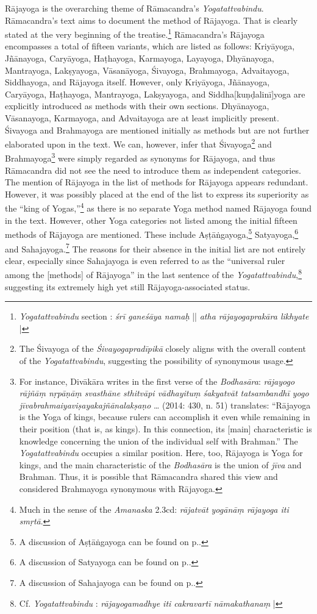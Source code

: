 Rājayoga is the overarching theme of Rāmacandra's \emph{Yogatattvabindu}. Rāmacandra's text aims to document the method of Rājayoga. That is clearly stated at the very beginning of the treatise.\footnote{\emph{Yogatattvabindu} section : \textit{śrī ganeśāya namaḥ} || \textit{atha rājayogaprakāra likhyate} |} Rāmacandra's Rājayoga encompasses a total of fifteen variants, which are listed as follows: Kriyāyoga, Jñānayoga, Caryāyoga, Haṭhayoga, Karmayoga, Layayoga, Dhyānayoga, Mantrayoga, Lakṣyayoga, Vāsanāyoga, Śivayoga, Brahmayoga, Advaitayoga, Siddhayoga, and Rājayoga itself. However, only Kriyāyoga, Jñānayoga, Caryāyoga, Haṭhayoga, Mantrayoga, Lakṣyayoga, and Siddha[kuṇḍalinī]yoga are explicitly introduced as methods with their own sections. Dhyānayoga, Vāsanayoga, Karmayoga, and Advaitayoga are at least implicitly present. Śivayoga and Brahmayoga are mentioned initially as methods but are not further elaborated upon in the text. We can, however, infer that Śivayoga\footnote{The Śivayoga of the \textit{Śivayogapradīpikā} closely aligns with the overall content of the \textit{Yogatattvabindu}, suggesting the possibility of synonymous usage.} and Brahmayoga\footnote{For instance, Divākāra writes in the first verse of the \textit{Bodhasāra}: \textit{rājayogo rājñāṃ nṛpāṇāṃ svasthāne sthitvāpi vādhayituṃ śakyatvāt tatsambandhī yogo jīvabrahmaiyaviṣayakajñānalakṣaṇo} \ldots \citeauthor{birch2014} (2014: 430, n. 51) translates: ``Rājayoga is the Yoga of kings, because rulers can accomplish it even while remaining in their position (that is, as kings). In this connection, its [main] characteristic is knowledge concerning the union of the individual self with Brahman.'' The \emph{Yogatattvabindu} occupies a similar position. Here, too, Rājayoga is Yoga for kings, and the main characteristic of the \emph{Bodhasāra} is the union of \textit{jīva} and Brahman. Thus, it is possible that Rāmacandra shared this view and considered Brahmayoga synonymous with Rājayoga.} were simply regarded as synonyms for Rājayoga, and thus Rāmacandra did not see the need to introduce them as independent categories. The mention of Rājayoga in the list of methods for Rājayoga appears redundant. However, it was possibly placed at the end of the list to express its superiority as the ``king of Yogas,''\footnote{Much in the sense of the \emph{Amanaska} 2.3cd: \textit{rājatvāt yogānāṃ rājayoga iti smṛtā}.} as there is no separate Yoga method named Rājayoga found in the text. However, other Yoga categories not listed among the initial fifteen methods of Rājayoga are mentioned. These include Aṣṭāṅgayoga,\footnote{A discussion of Aṣṭāṅgayoga can be found on p.\pageref{ashtangayoga}.} Satyayoga,\footnote{A discussion of Satyayoga can be found on p.\pageref{satyayoga}.} and Sahajayoga.\footnote{A discussion of Sahajayoga can be found on p.\pageref{sahajayoga}.} The reasons for their absence in the initial list are not entirely clear, especially since Sahajayoga is even referred to as the ``universal ruler among the [methods] of Rājayoga'' in the last sentence of the \textit{Yogatattvabindu},\footnote{Cf. \emph{Yogatattvabindu} : \textit{rājayogamadhye iti cakravartī nāmakathanaṃ} |} suggesting its extremely high yet still Rājayoga-associated status.


